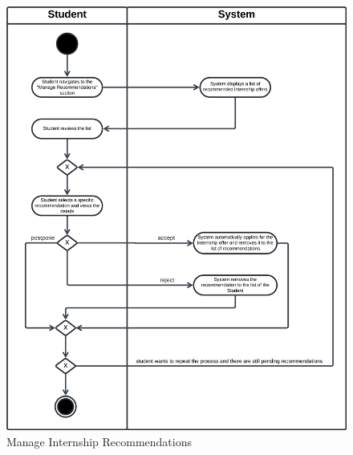 \begin{figure}[H]
    \begin{center}
         \includegraphics[width=1\linewidth]{LaTeXCode/images/activity diagram/UC11.png}
         \caption{Manage Internship Recommendations}
         \label{fig:manage_internship_recommendations_ad}
     \end{center}
\end{figure}

\newpage

